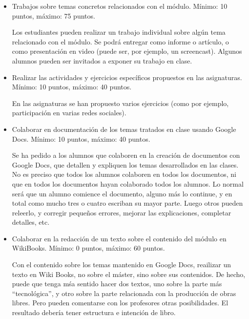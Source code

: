 \documentclass[a4paper,12pt]{article}
\begin{document}
\begin{itemize}

\item Trabajos sobre temas concretos relacionados con el módulo. Mínimo: 10 puntos, máximo: 75 puntos.

Los estudiantes pueden realizar un trabajo individual sobre algún tema relacionado con el módulo. Se podrá entregar como informe o artículo, o como presentación en video (puede ser, por ejemplo, un screencast). Algunos alumnos pueden ser invitados a exponer su trabajo en clase.



\item Realizar las actividades y ejercicios específicos propuestos en las asignaturas. Mínimo: 10 puntos, máximo: 40 puntos.

En las asignaturas se han propuesto varios ejercicios (como por ejemplo, participación en varias redes sociales). 

\item Colaborar en documentación de los temas tratados en clase usando Google Docs. Mínimo: 10 puntos, máximo: 40 puntos.

Se ha pedido a los alumnos que colaboren en la creación de documentos con Google Docs, que detallen y expliquen los temas desarrollados en las clases. No es preciso que todos los alumnos colaboren en todos los documentos, ni que en todos los documentos hayan colaborado todos los alumnos. Lo normal será que un alumno comience el documento, alguno más lo continue, y en total como mucho tres o cuatro escriban su mayor parte. Luego otros pueden releerlo, y corregir pequeños errores, mejorar las explicaciones, completar detalles, etc.

\item Colaborar en la redacción de un texto sobre el contenido del módulo en WikiBooks. Mínimo: 0 puntos, máximo: 60 puntos.

Con el contenido sobre los temas mantenido en Google Docs, reailizar un texto en Wiki Books, no sobre el máster, sino sobre sus contenidos. De hecho, puede que tenga mśa sentido hacer dos textos, uno sobre la parte más ``tecnológica'', y otro sobre la parte relacionada con la producción de obras libres. Pero pueden comentarse con los profesores otras posibilidades. El resultado debería tener estructura e intención de libro.

\end{itemize}
\end{document}
